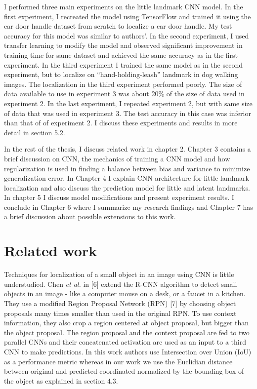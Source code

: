 \documentclass [11pt,letterpaper ,twoside ,openany ]{report}
\begin{document}
    I performed three main experiments on the little landmark CNN model. In the first experiment, I recreated the model using TensorFlow\textsuperscript{\textregistered} and trained it using the car door handle dataset from scratch to localize a car door handle. My test accuracy for this model was similar to authors'. In the second experiment, I used transfer learning to modify the model and observed significant improvement in training time for same dataset and achieved the same accuracy as in the first experiment. In the third experiment I trained the same model as in the second experiment, but to localize on ``hand-holding-leash'' landmark in dog walking images. The localization in the third experiment performed poorly. The size of data available to use in experiment 3 was about 20\% of the size of data used in experiment 2. In the last experiment, I repeated experiment 2, but with same size of data that was used in experiment 3. The test accuracy in this case was inferior than that of of experiment 2. I discuss these experiments and results in more detail in section 5.2.

    In the rest of the thesis, I discuss related work in chapter 2. Chapter 3 contains a brief discussion on CNN, the mechanics of training a CNN model and how regularization is used in finding a balance between bias and variance to minimize generalization error. In Chapter 4 I explain CNN architecture for little landmark localization  and also discuss the prediction model for little and latent landmarks. In chapter 5 I discuss model modifications and present experiment results. I conclude in Chapter 6 where I summarize my research findings and Chapter 7 has a brief discussion about possible extensions to this work.

    \chapter{Related work}
    \doublespacing
    Techniques for localization of a small object in an image using CNN is little understudied. Chen \textit{et al.} in [6] extend the R-CNN algorithm to detect small objects in an image - like a computer mouse on a desk, or a faucet in a kitchen. They use a modified Region Proposal Network (RPN) [7] by choosing object proposals many times smaller than used in the original RPN. To use context information, they also crop a region centered at object proposal, but bigger than the object proposal. The region proposal and the context proposal are fed to two parallel CNNs and their concatenated activation are used as an input to a third CNN to make predictions. In this work authors use Intersection over Union (IoU) as a performance metric whereas in our work we use the Euclidian distance between original and predicted coordinated normalized by the bounding box of the object as explained in section 4.3. 
\end{document}
